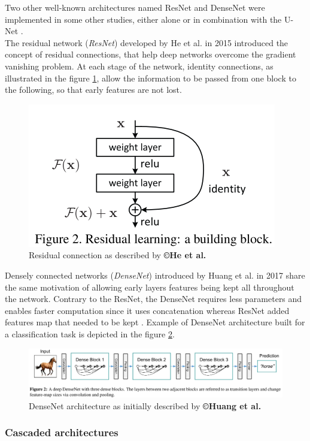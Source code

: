 Two other well-known architectures named ResNet and DenseNet were
implemented in some other studies, either alone or in combination with
the U-Net \cite{Han2017, Chlebus2018, Bi2017, Kaluva2018, Li2018}.\\
The residual network (\emph{ResNet}) developed by He et al. \cite{He2015} in
2015 introduced the concept of residual connections, that help deep
networks overcome the gradient vanishing problem. At each stage of the
network, identity connections, as illustrated in the figure \ref{ResidualConnection_Fig}, allow the
information to be passed from one block to the following, so that early
features are not lost.

\begin{figure}[th!]
	\centering
	\includegraphics[width=0.4\linewidth]{images/image6}
	\caption{Residual connection as described by \textbf{©He et al. \cite{He2015}}}
	\label{ResidualConnection_Fig}
\end{figure}

Densely connected networks (\emph{DenseNet}) introduced by Huang
et al. \cite{Huang2017} in 2017 share the same motivation of allowing early layers
features being kept all throughout the network. Contrary to the ResNet,
the DenseNet requires less parameters and enables faster computation
since it uses concatenation whereas ResNet added features map that
needed to be kept \cite{Huang2017}. Example of DenseNet
architecture built for a classification task is depicted in the figure \ref{DenseNet_Fig}.
\begin{figure}[th!]
	\centering
	\includegraphics[width=0.9\linewidth]{images/image32}
	\caption{DenseNet architecture as initially described by \textbf{©Huang et al. \cite{Huang2017}}}
	\label{DenseNet_Fig}
\end{figure}


\subsubsection{Cascaded architectures}

